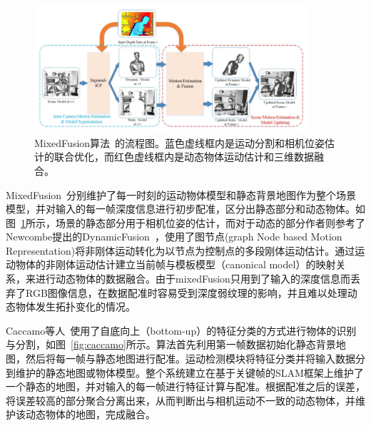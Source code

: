 \begin{figure}[thbp]
	\centering
	\includegraphics[width=0.9\textwidth]{figs/2-2/mixedFusion.jpeg} 
	\caption{MixedFusion算法~\cite{2017MixedFusion}的流程图。蓝色虚线框内是运动分割和相机位姿估计的联合优化，而红色虚线框内是动态物体运动估计和三维数据融合。}
	\label{fig:mixedFusion-framework}
\end{figure}

MixedFusion~\cite{2017MixedFusion}分别维护了每一时刻的运动物体模型和静态背景地图作为整个场景模型，并对输入的每一帧深度信息进行初步配准，区分出静态部分和动态物体。如图~\ref{fig:mixedFusion-framework}所示，场景的静态部分用于相机位姿的估计，而对于动态的部分作者则参考了Newcombe提出的DynamicFusion~\cite{2015DynamicFusion}，使用了图节点(graph Node based Motion Representation)将非刚体运动转化为以节点为控制点的多段刚体运动估计。通过运动物体的非刚体运动估计建立当前帧与模板模型（canonical model）的映射关系，来进行动态物体的数据融合。由于mixedFusion只用到了输入的深度信息而丢弃了RGB图像信息，在数据配准时容易受到深度弱纹理的影响，并且难以处理动态物体发生拓扑变化的情况。

Caccamo等人~\cite{2017Joint3D}使用了自底向上（bottom-up）的特征分类的方式进行物体的识别与分割，如图~\ref{fig:caccamo}所示。算法首先利用第一帧数据初始化静态背景地图，然后将每一帧与静态地图进行配准。运动检测模块将特征分类并将输入数据分到维护的静态地图或物体模型。整个系统建立在基于关键帧的SLAM框架上维护了一个静态的地图，并对输入的每一帧进行特征计算与配准。根据配准之后的误差，将误差较高的部分聚合分离出来，从而判断出与相机运动不一致的动态物体，并维护该动态物体的地图，完成融合。

